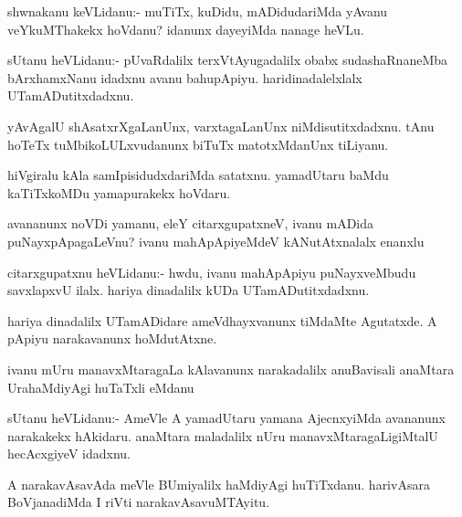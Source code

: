 \begin{mng}
shwnakanu keVLidanu:- muTiTx, kuDidu, mADidudariMda yAvanu veYkuMThakekx hoVdanu? idanunx dayeyiMda nanage heVLu.
\end{mng}

\begin{mng}
sUtanu heVLidanu:- pUvaRdalilx terxVtAyugadalilx obabx sudashaRnaneMba bArxhamxNanu idadxnu avanu bahupApiyu. haridinadalelxlalx UTamADutitxdadxnu.
\end{mng}

\begin{mng}
yAvAgalU shAsatxrXgaLanUnx, varxtagaLanUnx niMdisutitxdadxnu. tAnu hoTeTx tuMbikoLULxvudanunx biTuTx matotxMdanUnx tiLiyanu.
\end{mng}

\begin{mng}
hiVgiralu kAla samIpisidudxdariMda satatxnu. yamadUtaru baMdu kaTiTxkoMDu yamapurakekx hoVdaru.
\end{mng}

\begin{mng}
avananunx noVDi yamanu,  eleY citarxgupatxneV, ivanu mADida puNayxpApagaLeVnu? ivanu mahApApiyeMdeV kANutAtxnalalx enanxlu
\end{mng}

\begin{mng}
citarxgupatxnu heVLidanu:- hwdu, ivanu mahApApiyu puNayxveMbudu savxlapxvU ilalx. hariya dinadalilx kUDa UTamADutitxdadxnu.
\end{mng}

\begin{mng}
hariya dinadalilx UTamADidare ameVdhayxvanunx tiMdaMte Agutatxde. A pApiyu narakavanunx hoMdutAtxne.
\end{mng}

\begin{mng}
ivanu mUru manavxMtaragaLa kAlavanunx narakadalilx anuBavisali anaMtara UrahaMdiyAgi huTaTxli eMdanu
\end{mng}

\begin{mng}
sUtanu heVLidanu:- AmeVle A yamadUtaru yamana AjecnxyiMda avananunx narakakekx hAkidaru. anaMtara maladalilx nUru manavxMtaragaLigiMtalU hecAcxgiyeV idadxnu.
\end{mng}

\begin{mng}
A narakavAsavAda meVle BUmiyalilx haMdiyAgi huTiTxdanu. harivAsara BoVjanadiMda I riVti narakavAsavuMTAyitu.
\end{mng}

